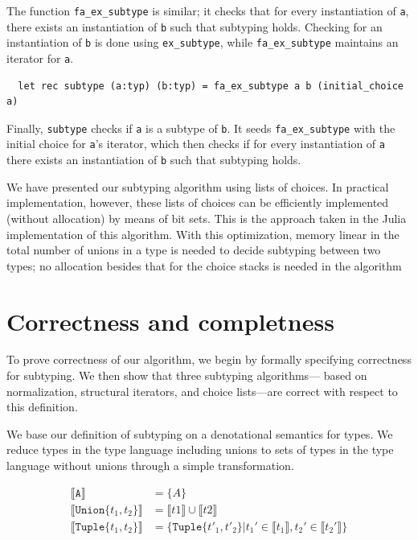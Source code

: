 \documentclass[a4paper,english]{lipics-v2018}
\newcommand{\xt}[1]{\texttt{#1}}
\newcommand{\tuplet}[2]{\xt{Tuple\{}#1,#2\xt{\}}}
\newcommand{\union}[2]{\xt{Union\{}#1,#2\xt{\}}}
\newcommand{\denotes}[1]{\llbracket #1 \rrbracket}
\begin{document}
The function \verb|fa_ex_subtype| is similar; it checks that for every
instantiation of \verb|a|, there exists an instantiation of 
\verb|b| such that subtyping holds. Checking for an instantiation
of \verb|b| is done using \verb|ex_subtype|, while \verb|fa_ex_subtype|
maintains an iterator for \verb|a|.

\begin{small}
\begin{verbatim}
  let rec subtype (a:typ) (b:typ) = fa_ex_subtype a b (initial_choice a)
\end{verbatim}
\end{small}

Finally, \verb|subtype| checks if \verb|a| is a subtype of \verb|b|.
It seeds \verb|fa_ex_subtype| with the initial choice for \verb|a|'s
iterator, which then checks if for every instantiation of \verb|a|
there exists an instantiation of \verb|b| such that subtyping holds.

We have presented our subtyping algorithm using lists of choices. In practical
implementation, however, these lists of choices can be efficiently implemented
(without allocation) by means of bit sets. This is the approach taken in the Julia
implementation of this algorithm. With this optimization, memory linear in the
total number of unions in a type is needed to decide subtyping between two types;
no allocation besides that for the choice stacks is needed in the algorithm

\section{Correctness and completness}

To prove correctness of our algorithm, we begin by formally specifying
correctness for subtyping. We then show that three subtyping algorithms---
based on  normalization, structural iterators, and choice lists---are correct
with respect to this definition.

We base our definition of subtyping on a denotational semantics for types. 
We reduce types in the type language including unions to sets of types
in the type language without unions through a simple transformation. 

\begin{align*}
\denotes{\xt{A}} &= \{A\} \\
\denotes{\union{t_1}{t_2}} &= \denotes{t1} \cup \denotes{t2} \\
\denotes{\tuplet{t_1}{t_2}} &= \{\tuplet{t'_1}{t'_2} | t_1' \in \denotes{t_1},  t_2' \in \denotes{t_2'}\} \\
\end{align*}
\end{document}
